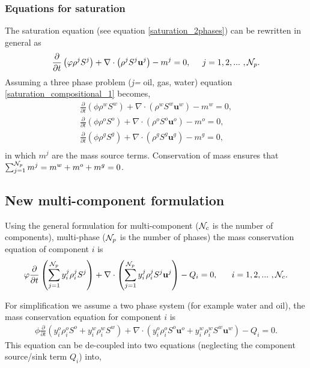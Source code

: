 \subsubsection{Equations for saturation}

 The saturation equation (see equation \ref{saturation_2phases}) can be rewritten 
 in general as
\begin{equation}
\displaystyle\frac{\partial}{\partial t}\left(\phi\rho^{j}S^{j}\right) + \nabla\cdot\left(\rho^{j}S^{j}\mathbf{u}^{j}\right) -m^{j} = 0,\;\;\;\;\; j = 1,2,...~, {\cal N}_p .
\label{saturation_compositional_1}
\end{equation}
Assuming a three phase problem ({\it j=} oil, gas, water)  
equation \ref{saturation_compositional_1} becomes,
\begin{eqnarray}
\displaystyle\frac{\partial}{\partial t}\left(\phi\rho^{w}S^{w}\right) + \nabla\cdot\left(\rho^{w}S^{w}\mathbf{u}^{w}\right) -m^{w} = 0, \nonumber \\
\displaystyle\frac{\partial}{\partial t}\left(\phi\rho^{o}S^{o}\right) + \nabla\cdot\left(\rho^{o}S^{o}\mathbf{u}^{o}\right) -m^{o} = 0, \\
\displaystyle\frac{\partial}{\partial t}\left(\phi\rho^{g}S^{g}\right) + \nabla\cdot\left(\rho^{g}S^{g}\mathbf{u}^{g}\right) -m^{g} = 0, \nonumber \\
\label{saturation_compositional_2}
\end{eqnarray}
in which $m^j$ are the mass source terms. Conservation of 
mass ensures that $\sum_{j=1}^{{\cal N}_p} m^j=m^{w}+m^{o}+m^{g}=0$. 


\subsection{New multi-component formulation}
Using the general formulation for multi-component (${\cal N}_c$ is the number of components), multi-phase (${\cal N}_p$ is the number of phases) the mass conservation equation of component $i$ is
\begin{equation}
\phi \displaystyle\frac{\partial}{\partial t}\left(\sum\limits_{j=1}^{{\cal N}_p}y_{i}^{j}\rho_{i}^{j}S^{j}\right) + \nabla\cdot\left(\sum\limits_{j=1}^{{\cal N}_p}y_{i}^{j}\rho_{i}^{j}S^{j}\mathbf{u}^{j}\right) - Q_{i} = 0, ~~~~~ i = 1,2,...~ , {\cal N}_c . 
\label{saturation_compositional_4}
\end{equation}

For simplification we assume a two phase system (for example water and oil), the mass conservation equation for component $i$ is 
\begin{eqnarray}
\phi \displaystyle\frac{\partial}{\partial t}\left(y_{i}^{o}\rho_i^{o}S^{o} + y_{i}^{w}\rho_i^{w}S^{w}  \right) + 
\nabla\cdot\left(y_{i}^{o}\rho_i^{o}S^{o}\mathbf{u}^{o} + y_{i}^{w}\rho_i^{w}S^{w}\mathbf{u}^{w}  \right) - Q_{i} = 0 . 
\end{eqnarray}
This equation can be de-coupled into 
two equations (neglecting the component source/sink term $Q_i$) into,

